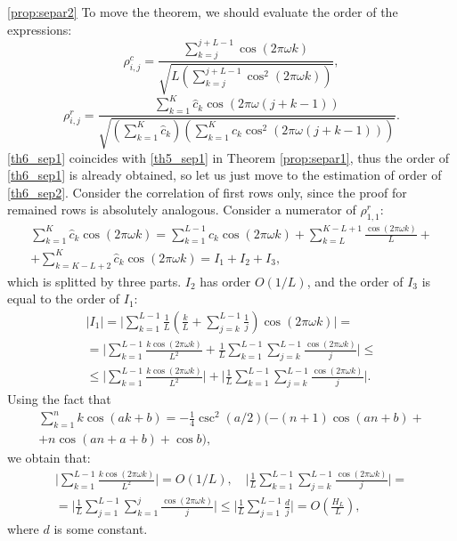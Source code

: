 \documentclass[12pt,a4paper,fleqn,leqno]{article}
\begin{document}
\begin{proof5}{\ref{prop:separ2}}
To move the theorem, we should evaluate the order of the expressions:
\begin{equation}\label{th6_sep1}
\rho^c_{i,j} = \frac{\sum_{k=j}^{j + L - 1} \cos(2 \pi \omega k)}{\sqrt{L (\sum_{k=j}^{j + L - 1} \cos^2(2 \pi \omega k))}},
\end{equation}
\begin{equation}\label{th6_sep2}
\rho^r_{i,j} = \frac{\sum_{k=1}^K \hat c_k\cos(2 \pi \omega (j + k - 1))}{\sqrt{(\sum_{k=1}^K \hat c_k) (\sum_{k=1}^K \hat c_k\cos^2(2 \pi \omega (j + k - 1)))}}.
\end{equation}
\eqref{th6_sep1} coincides with \eqref{th5_sep1} in Theorem \ref{prop:separ1}, thus
 the order of \eqref{th6_sep1} is already obtained, so let us just move to the estimation of order of \eqref{th6_sep2}. Consider the correlation of first rows only, since the proof for remained rows is absolutely analogous. Consider a numerator of $\rho^r_{1,1}$:
\begin{gather*}
\sum_{k=1}^K \hat c_k\cos(2 \pi \omega k) = \sum_{k=1}^{L-1} \hat c_k\cos(2 \pi \omega k) + \sum_{k=L}^{K - L + 1} \frac{\cos(2 \pi \omega k)}{L} +\\+ \sum_{k=K - L + 2}^{K} \hat c_k\cos(2 \pi \omega k) = I_1 + I_2 + I_3,
\end{gather*}
which is splitted by three parts. $I_2$ has order $O(1/L)$, and the order of $I_3$ is equal to the order of $I_1$:
\begin{gather*}
|I_1|=\bigg|\sum_{k=1}^{L-1}\frac{1}{L}\left(\frac{k}{L} + \sum_{j=k}^{L-1} \frac{1}{j} \right) \cos(2 \pi \omega k)\bigg| =\\= \bigg|\sum_{k=1}^{L-1} \frac{k \cos(2 \pi \omega k)}{L^2} +  \frac{1}{L}\sum_{k = 1}^{L-1}\sum_{j = k}^{L-1}\frac{\cos(2 \pi \omega k)}{j}\bigg| \le \\ \le
\bigg|\sum_{k=1}^{L-1} \frac{k \cos(2 \pi \omega k)}{L^2}\bigg| + \bigg|\frac{1}{L}\sum_{k = 1}^{L-1}\sum_{j = k}^{L-1}\frac{\cos(2 \pi \omega k)}{j}\bigg|.
\end{gather*}
Using the fact that
\begin{gather*}
\sum_{k=1}^n k \cos(ak + b) = -\frac{1}{4}\csc^2(a/2)(-(n+1)\cos(an+b) + \\ + n\cos(an + a + b) + \cos b),
\end{gather*}
we obtain that:
\begin{gather*}
\bigg|\sum_{k=1}^{L-1} \frac{k \cos(2 \pi \omega k)}{L^2}\bigg| = O(1/L), \quad
\bigg|\frac{1}{L}\sum_{k = 1}^{L-1}\sum_{j = k}^{L-1}\frac{\cos(2 \pi \omega k)}{j}\bigg| = \\ =\bigg|\frac{1}{L}\sum_{j = 1}^{L-1}\sum_{k = 1}^{j}\frac{\cos(2 \pi \omega k)}{j}\bigg| \le \bigg|\frac{1}{L}\sum_{j = 1}^{L-1}\frac{d}{j}\bigg| = O \left(\frac{H_L}{L} \right),
\end{gather*}
where $d$ is some constant.


\end{proof5}
\end{document}
